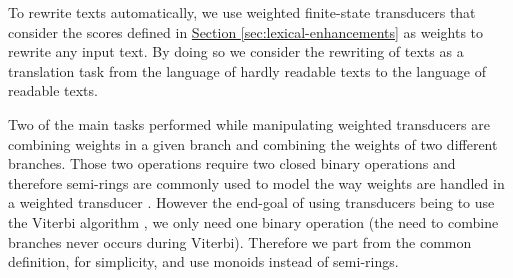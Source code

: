 \documentclass[a4paper, 11pt, onepage]{scrreprt}
\newcommand\sectionref[1]{\hyperref[#1]{Section \ref*{#1}}}
\begin{document}
To rewrite texts automatically, we use weighted finite-state
transducers that consider the scores defined
in \sectionref{sec:lexical-enhancements} as weights to rewrite any
input text. By doing so we consider the rewriting of texts as a
translation task from the language of hardly readable texts to the
language of readable texts.

Two of the main tasks performed while manipulating weighted
transducers are combining weights in a given branch and combining the
weights of two different branches. Those two operations require two
closed binary operations and therefore semi-rings are commonly used to
model the way weights are handled in a weighted transducer
\cite{mohri2004weighted}. However the end-goal of using transducers
being to use the Viterbi algorithm \cite{forney1973viterbi}, we only
need one binary operation (the need to combine branches never occurs
during Viterbi). Therefore we part from the common definition, for
simplicity, and use monoids instead of semi-rings.
\end{document}
